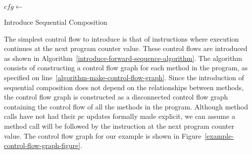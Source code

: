 \begin{algorithm}
  \begin{algorithmic}[1]
    \State $cfg \gets$ 
    \label{algorithm-make-control-flow-graph}
    \label{algorithm-sequence-cfg-loop}
    \label{algorithm-forward-sequence-condition}
    \State {}
    \label{algorithm-forward-sequence-application}
    \EndWhile
    \EndFor
    \EndProcedure
  \end{algorithmic}
  \caption{Introduce Sequential Composition}
  \label{introduce-forward-sequence-algorithm}
\end{algorithm}
The simplest control flow to introduce is that of instructions where
execution continues at the next program counter value.
These control flows are introduced as shown in
Algorithm~\ref{introduce-forward-sequence-algorithm}.
The algorithm consists of constructing a control flow graph for each
method in the program, as specified on
line~\ref{algorithm-make-control-flow-graph}.
Since the introduction of sequential composition does not depend on
the relationships between methods, the control flow graph is
constructed as a disconnected control flow graph containing the
control flow of all the methods in the program.
Although method calls have not had their $pc$ updates formally made
explicit, we can assume a method call will be followed by the
instruction at the next program counter value.
The control flow graph for our example is shown in
Figure~\ref{example-control-flow-graph-figure}.

